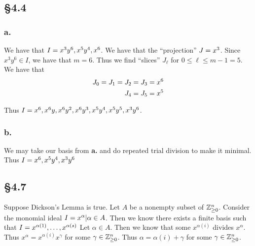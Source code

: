 \documentclass[letterpaper]{article}
\begin{document}
\clearpage

\subsection*{\S 4.4}

\subsubsection*{a.}

We have that $I = \gen{x^{3}y^{6}, x^{5}y^{4}, x^{6}}$.
We have that the ``projection'' $J = \gen{x^{3}}$.
Since $x^{3}y^{6} \in I$, we have that $m = 6$.
Thus we find ``slices'' $J_{\ell}$ for $0 \leq \ell \leq m - 1 = 5$.
We have that
\begin{align*}
  J_{0} = J_{1} = J_{2} = J_{3} &= \gen{x^{6}} \\
  J_{4} = J_{5} &= \gen{x^{5}} \\
\end{align*}

Thus $I = \gen{x^{6}, x^{6}y, x^{6}y^{2}, x^{6}y^{3}, x^{5}y^{4}, x^{5}y^{5}, x^{3}y^{6}}$.

\subsubsection*{b.}

We may take our basis from \textbf{a.} and do repeated trial division to make it minimal.
Thus $I = \gen{x^{6}, x^{5}y^{4}, x^{3}y^{6}}$

\subsection*{\S 4.7}

Suppose Dickson's Lemma is true.
Let $A$ be a nonempty subset of $\mathbb{Z}_{\geq 0}^{n}$.
Consider the monomial ideal $I = \gen{x^{\alpha} | \alpha \in A}$.
Then we know there exists a finite basis such that $I = \gen{x^{\alpha(1)}, \ldots, x^{\alpha(s)}}$ Let $\alpha \in A$.
Then we know that some $x^{\alpha(i)}$ divides $x^{\alpha}$.
Thus $x^{\alpha} = x^{\alpha(i)} x^{\gamma}$ for some $\gamma \in \mathbb{Z}_{\geq 0}^{n}$.
Thus $\alpha = \alpha(i) + \gamma$ for some $\gamma \in \mathbb{Z}_{\geq 0}^{n}$.
\end{document}

